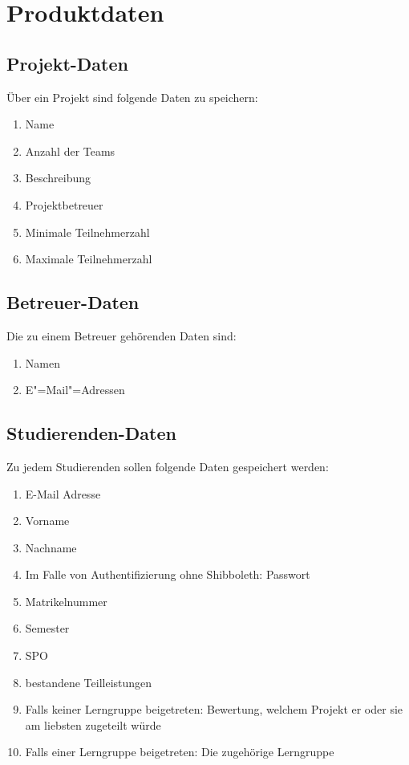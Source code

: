 \documentclass[parskip=full]{scrartcl}
\newcommand{\swtLabel}[1]{\textbf{/#1\arabic*0/}}
\begin{document}
\section{Produktdaten}

\subsection{Projekt-Daten} 
Über ein Projekt sind folgende Daten zu speichern:
\begin{enumerate}[label=\swtLabel{D}] 
  \item Name
  \item Anzahl der Teams
  \item Beschreibung
  \item Projektbetreuer
  \item Minimale Teilnehmerzahl
  \item Maximale Teilnehmerzahl
\end{enumerate}
\subsection{Betreuer-Daten}
Die zu einem Betreuer gehörenden Daten sind:
\begin{enumerate}[label=\swtLabel{D}, resume] 
	\item Namen 
	\item E"=Mail"=Adressen
\end{enumerate}
\subsection{Studierenden-Daten} 
Zu jedem Studierenden sollen folgende Daten gespeichert werden:
\begin{enumerate}[label=\swtLabel{D}, resume] 
  \item E-Mail Adresse \label{SDatenAnfang}
  \item Vorname
  \item Nachname
  \item Im Falle von Authentifizierung ohne Shibboleth: Passwort
  \item Matrikelnummer
  \item Semester
  \item SPO
  \item bestandene Teilleistungen \label{SDatenEnde}
  \item Falls keiner Lerngruppe beigetreten: Bewertung, welchem Projekt er oder
  sie am liebsten zugeteilt würde
  \item Falls einer Lerngruppe beigetreten: Die zugehörige Lerngruppe
\end{enumerate}
\end{document}
